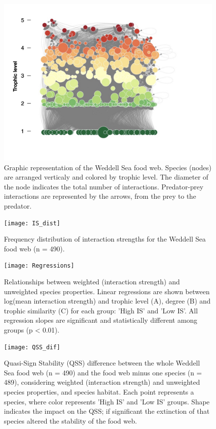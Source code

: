 \documentclass[gc, manuscript]{copernicus}
\begin{document}
\clearpage

\begin{figure}
\includegraphics[width=12cm]{WeddellSea_net} \caption{Graphic representation of the Weddell Sea food web. Species (nodes) are arranged verticaly and colored by trophic level. The diameter of the node indicates the total number of interactions. Predator-prey interactions are represented by the arrows, from the prey to the predator.}\label{fig:unnamed-chunk-3}
\end{figure}

\clearpage

\begin{figure}
\texttt{[image: IS\_dist]} \caption{Frequency distribution of interaction strengths for the Weddell Sea food web (n = 490).}\label{fig:unnamed-chunk-4}
\end{figure}

\clearpage

\begin{figure}
\texttt{[image: Regressions]} \caption{Relationships between weighted (interaction strength) and unweighted species properties. Linear regressions are shown between log(mean interaction strength) and trophic level (A), degree (B) and trophic similarity (C) for each group: 'High IS' and 'Low IS'. All regression slopes are significant and statistically different among groups (p < 0.01).}\label{fig:unnamed-chunk-5}
\end{figure}

\clearpage

\begin{figure}
\texttt{[image: QSS\_dif]} \caption{Quasi-Sign Stability (QSS) difference between the whole Weddell Sea food web (n = 490) and the food web minus one species (n = 489), considering weighted (interaction strength) and unweighted species properties, and species habitat. Each point represents a species, where color represents 'High IS' and 'Low IS' groups. Shape indicates the impact on the QSS; if significant the extinction of that species altered the stability of the food web.}\label{fig:unnamed-chunk-6}
\end{figure}
\end{document}
